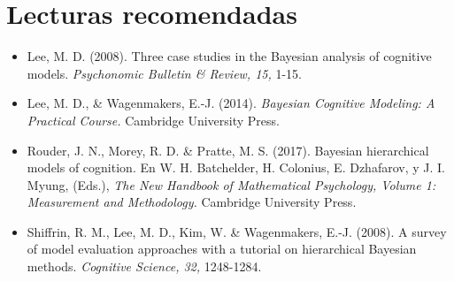 \documentclass{article}
\begin{document}
\section*{Lecturas recomendadas}
	\begin{itemize}
	
	\item[]{Lee, M. D. (2008). Three case studies in the Bayesian analysis of cognitive models. \emph{Psychonomic Bulletin \& Review, 15,} 1-15.}

	\item[]{Lee, M. D., \& Wagenmakers, E.-J. (2014). \emph{Bayesian Cognitive Modeling: A Practical Course.} Cambridge University Press.}
	
    \item[]{Rouder, J. N., Morey, R. D. \& Pratte, M. S. (2017). Bayesian hierarchical models of cognition. En W. H. Batchelder, H. Colonius, E. Dzhafarov, y J. I. Myung, (Eds.), \emph{The New Handbook of Mathematical Psychology, Volume 1: Measurement and Methodology.} Cambridge University Press.} 
    
     \item[]{Shiffrin, R. M., Lee, M. D., Kim, W. \& Wagenmakers, E.-J. (2008). A survey of model evaluation approaches with a tutorial on hierarchical Bayesian methods. \emph{Cognitive Science, 32,} 1248-1284.}
      
    \end{itemize}


    
\end{document}
